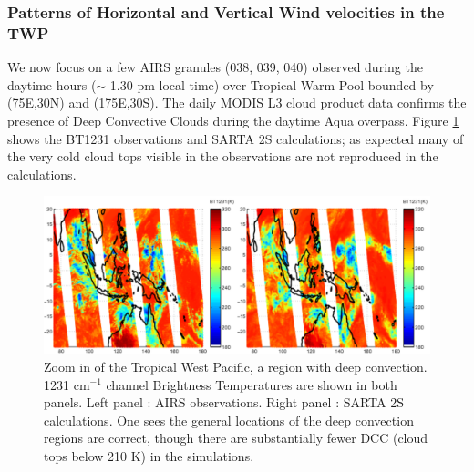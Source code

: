 \documentclass[agupp]{aguplus}              %
\newcommand{\wn}{cm$^{-1}$\xspace}
\begin{document}
\begin{article}
\subsubsection{Patterns of Horizontal and Vertical Wind velocities in the TWP}

We now focus on a few AIRS granules (038, 039, 040) observed during
the daytime hours ($\sim$ 1.30 pm local time) over Tropical Warm Pool
bounded by (75E,30N) and (175E,30S). The daily MODIS L3 cloud product
data confirms the presence of Deep Convective Clouds during the
daytime Aqua overpass.  Figure \ref{dcc_obs_sarta} shows the BT1231
observations and SARTA 2S calculations; as expected many of the very
cold cloud tops visible in the observations are not reproduced in the
calculations.

\begin{figure} \center
\noindent\includegraphics[width=\textwidth]{FIGS/dcc_twp_obs_sartaV2.pdf}
\caption{Zoom in of the Tropical West Pacific, a region with deep convection. 
          1231 \wn channel Brightness Temperatures are shown in both panels. 
          Left panel : AIRS observations. Right panel : SARTA 2S calculations.
          One sees the general locations of the deep convection regions are correct,
          though there are substantially fewer DCC (cloud tops below 210 K) in the
          simulations.}
\label{dcc_obs_sarta}
\end{figure}



\end{article}
\end{document}
